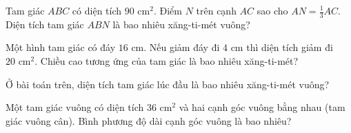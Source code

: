 \begin{ex}
  Tam giác $ABC$ có diện tích $90\text{ cm}^2$. Điểm $N$ trên cạnh $AC$ sao cho $AN = \frac{1}{3} AC$. Diện tích tam giác $ABN$ là bao nhiêu xăng-ti-mét vuông?
\end{ex}

\begin{ex}
  Một hình tam giác có đáy $16\text{ cm}$. Nếu giảm đáy đi $4\text{ cm}$ thì diện tích giảm đi $20\text{ cm}^2$. Chiều cao tương ứng của tam giác là bao nhiêu xăng-ti-mét?
\end{ex}

\begin{ex}
  Ở bài toán trên, diện tích tam giác lúc đầu là bao nhiêu xăng-ti-mét vuông?
\end{ex}

\begin{ex}
  Một tam giác vuông có diện tích $36\text{ cm}^2$ và hai cạnh góc vuông bằng nhau (tam giác vuông cân). Bình phương độ dài cạnh góc vuông là bao nhiêu?
\end{ex}
